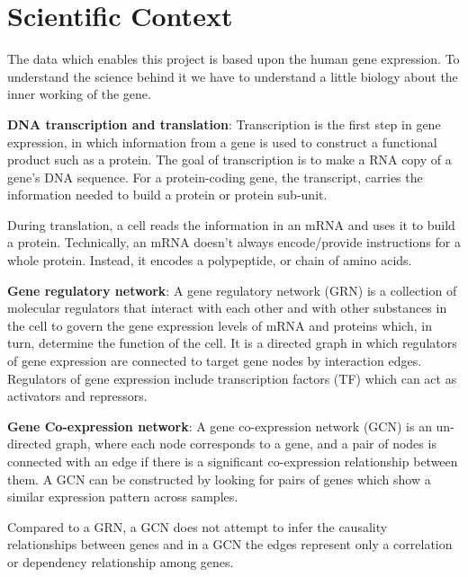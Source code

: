 \documentclass[a4paper]{paper}
\begin{document}
\section{Scientific Context} 
The data which enables this project is based upon the human gene expression. To understand the science behind it we have to understand a little biology about the inner working of the gene. 
\begin{flushleft}
\textbf{DNA transcription and translation}: Transcription is the first step in gene expression, in which information from a gene is used to construct a functional product such as a protein. The goal of transcription is to make a RNA copy of a gene's DNA sequence. For a protein-coding gene, the transcript, carries the information needed to build a protein or protein sub-unit. 
\end{flushleft}
\begin{flushleft}
 During translation, a cell reads the information in an mRNA and uses it to build a protein. Technically, an mRNA doesn’t always encode/provide instructions for a whole protein. Instead, it encodes a polypeptide, or chain of amino acids.
\end{flushleft}

\begin{flushleft}
\textbf{Gene regulatory network}: A gene regulatory network (GRN) is a collection of molecular regulators that interact with each other and with other substances in the cell to govern the gene expression levels of mRNA and proteins which, in turn, determine the function of the cell. It is a directed graph in which regulators of gene expression are connected to target gene nodes by interaction edges. Regulators of gene expression include transcription factors (TF) which can act as activators and repressors.
\end{flushleft}

\begin{flushleft}
\textbf{Gene Co-expression network}: A gene co-expression network (GCN) is an un-directed graph, where each node corresponds to a gene, and a pair of nodes is connected with an edge if there is a significant co-expression relationship between them. A GCN can be constructed by looking for pairs of genes which show a similar expression pattern across samples.
\end{flushleft}

\bigskip

Compared to a GRN, a GCN does not attempt to infer the causality relationships between genes and in a GCN the edges represent only a correlation or dependency relationship among genes.
\end{document}
